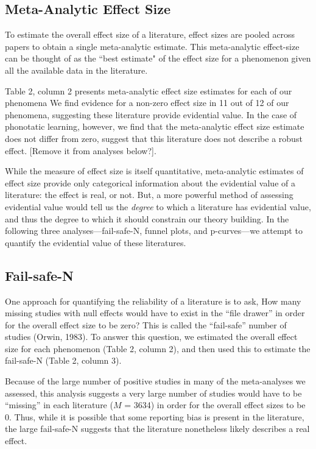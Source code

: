 \documentclass[english,floatsintext,man]{apa6}
\begin{document}
\subsection{Meta-Analytic Effect Size}\label{meta-analytic-effect-size}

To estimate the overall effect size of a literature, effect sizes are
pooled across papers to obtain a single meta-analytic estimate. This
meta-analytic effect-size can be thought of as the ``best estimate" of
the effect size for a phenomenon given all the available data in the
literature.

Table 2, column 2 presents meta-analytic effect size estimates for each
of our phenomena We find evidence for a non-zero effect size in 11 out
of 12 of our phenomena, suggesting these literature provide evidential
value. In the case of phonotatic learning, however, we find that the
meta-analytic effect size estimate does not differ from zero, suggest
that this literature does not describe a robust effect. {[}Remove it
from analyses below?{]}.

While the measure of effect size is itself quantitative, meta-analytic
estimates of effect size provide only categorical information about the
evidential value of a literature: the effect is real, or not. But, a
more powerful method of assessing evidential value would tell us the
\emph{degree} to which a literature has evidential value, and thus the
degree to which it should constrain our theory building. In the
following three analyses---fail-safe-N, funnel plots, and p-curves---we
attempt to quantify the evidential value of these literatures.

\subsection{Fail-safe-N}\label{fail-safe-n}

One approach for quantifying the reliability of a literature is to ask,
How many missing studies with null effects would have to exist in the
\enquote{file drawer} in order for the overall effect size to be zero?
This is called the \enquote{fail-safe} number of studies (Orwin, 1983).
To answer this question, we estimated the overall effect size for each
phenomenon (Table 2, column 2), and then used this to estimate the
fail-safe-N (Table 2, column 3).

Because of the large number of positive studies in many of the
meta-analyses we assessed, this analysis suggests a very large number of
studies would have to be \enquote{missing} in each literature (\(M\) =
3634) in order for the overall effect sizes to be 0. Thus, while it is
possible that some reporting bias is present in the literature, the
large fail-safe-N suggests that the literature nonetheless likely
describes a real effect.
\end{document}
